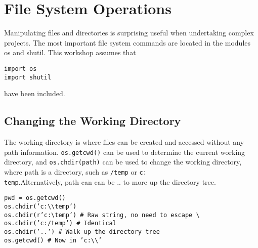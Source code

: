 \documentclass[PyData.tex]{subfiles}
\begin{document}
 
\newpage
\section{File System Operations}
Manipulating files and directories is surprising useful when undertaking complex projects. The most important
file system commands are located in the modules os and shutil. This workshop assumes that
\begin{framed}
\begin{verbatim}
import os
import shutil
\end{verbatim}
\end{framed}
have been included.
\subsection{Changing the Working Directory}
The working directory is where files can be created and accessed without any path information. \texttt{os.getcwd()}
can be used to determine the current working directory, and \texttt{os.chdir(path)} can be used to change the
working directory, where path is a directory, such as \texttt{/temp} or \texttt{c:\\temp}.Alternatively, path can can be .. to
more up the directory tree.
\begin{framed}
\begin{verbatim}
pwd = os.getcwd()
os.chdir(’c:\\temp’)
os.chdir(r’c:\temp’) # Raw string, no need to escape \
os.chdir(’c:/temp’) # Identical
os.chdir(’..’) # Walk up the directory tree
os.getcwd() # Now in ’c:\\’
\end{verbatim}
\end{framed}
\end{document}

